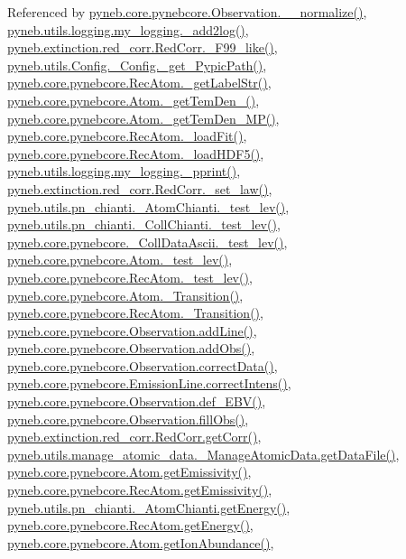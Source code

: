 Referenced by \hyperlink{pynebcore_8py_source_l04007}{pyneb.\-core.\-pynebcore.\-Observation.\-\_\-\-\_\-normalize()}, \hyperlink{logging_8py_source_l00059}{pyneb.\-utils.\-logging.\-my\-\_\-logging.\-\_\-add2log()}, \hyperlink{red__corr_8py_source_l00658}{pyneb.\-extinction.\-red\-\_\-corr.\-Red\-Corr.\-\_\-\-F99\-\_\-like()}, \hyperlink{_config_8py_source_l00115}{pyneb.\-utils.\-Config.\-\_\-\-Config.\-\_\-get\-\_\-\-Pypic\-Path()}, \hyperlink{pynebcore_8py_source_l02970}{pyneb.\-core.\-pynebcore.\-Rec\-Atom.\-\_\-get\-Label\-Str()}, \hyperlink{pynebcore_8py_source_l01869}{pyneb.\-core.\-pynebcore.\-Atom.\-\_\-get\-Tem\-Den\-\_()}, \hyperlink{pynebcore_8py_source_l02046}{pyneb.\-core.\-pynebcore.\-Atom.\-\_\-get\-Tem\-Den\-\_\-\-M\-P()}, \hyperlink{pynebcore_8py_source_l02754}{pyneb.\-core.\-pynebcore.\-Rec\-Atom.\-\_\-load\-Fit()}, \hyperlink{pynebcore_8py_source_l02714}{pyneb.\-core.\-pynebcore.\-Rec\-Atom.\-\_\-load\-H\-D\-F5()}, \hyperlink{logging_8py_source_l00051}{pyneb.\-utils.\-logging.\-my\-\_\-logging.\-\_\-pprint()}, \hyperlink{red__corr_8py_source_l00176}{pyneb.\-extinction.\-red\-\_\-corr.\-Red\-Corr.\-\_\-set\-\_\-law()}, \hyperlink{pn__chianti_8py_source_l00304}{pyneb.\-utils.\-pn\-\_\-chianti.\-\_\-\-Atom\-Chianti.\-\_\-test\-\_\-lev()}, \hyperlink{pn__chianti_8py_source_l00472}{pyneb.\-utils.\-pn\-\_\-chianti.\-\_\-\-Coll\-Chianti.\-\_\-test\-\_\-lev()}, \hyperlink{pynebcore_8py_source_l01045}{pyneb.\-core.\-pynebcore.\-\_\-\-Coll\-Data\-Ascii.\-\_\-test\-\_\-lev()}, \hyperlink{pynebcore_8py_source_l01525}{pyneb.\-core.\-pynebcore.\-Atom.\-\_\-test\-\_\-lev()}, \hyperlink{pynebcore_8py_source_l02672}{pyneb.\-core.\-pynebcore.\-Rec\-Atom.\-\_\-test\-\_\-lev()}, \hyperlink{pynebcore_8py_source_l01433}{pyneb.\-core.\-pynebcore.\-Atom.\-\_\-\-Transition()}, \hyperlink{pynebcore_8py_source_l02812}{pyneb.\-core.\-pynebcore.\-Rec\-Atom.\-\_\-\-Transition()}, \hyperlink{pynebcore_8py_source_l03558}{pyneb.\-core.\-pynebcore.\-Observation.\-add\-Line()}, \hyperlink{pynebcore_8py_source_l03589}{pyneb.\-core.\-pynebcore.\-Observation.\-add\-Obs()}, \hyperlink{pynebcore_8py_source_l04028}{pyneb.\-core.\-pynebcore.\-Observation.\-correct\-Data()}, \hyperlink{pynebcore_8py_source_l03447}{pyneb.\-core.\-pynebcore.\-Emission\-Line.\-correct\-Intens()}, \hyperlink{pynebcore_8py_source_l03983}{pyneb.\-core.\-pynebcore.\-Observation.\-def\-\_\-\-E\-B\-V()}, \hyperlink{pynebcore_8py_source_l03574}{pyneb.\-core.\-pynebcore.\-Observation.\-fill\-Obs()}, \hyperlink{red__corr_8py_source_l00211}{pyneb.\-extinction.\-red\-\_\-corr.\-Red\-Corr.\-get\-Corr()}, \hyperlink{manage__atomic__data_8py_source_l00297}{pyneb.\-utils.\-manage\-\_\-atomic\-\_\-data.\-\_\-\-Manage\-Atomic\-Data.\-get\-Data\-File()}, \hyperlink{pynebcore_8py_source_l01782}{pyneb.\-core.\-pynebcore.\-Atom.\-get\-Emissivity()}, \hyperlink{pynebcore_8py_source_l02990}{pyneb.\-core.\-pynebcore.\-Rec\-Atom.\-get\-Emissivity()}, \hyperlink{pn__chianti_8py_source_l00366}{pyneb.\-utils.\-pn\-\_\-chianti.\-\_\-\-Atom\-Chianti.\-get\-Energy()}, \hyperlink{pynebcore_8py_source_l02927}{pyneb.\-core.\-pynebcore.\-Rec\-Atom.\-get\-Energy()}, \hyperlink{pynebcore_8py_source_l02176}{pyneb.\-core.\-pynebcore.\-Atom.\-get\-Ion\-Abundance()}, 